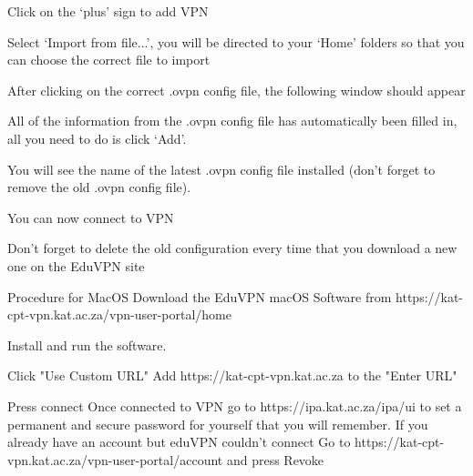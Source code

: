 Click on the ‘plus’ sign to add VPN

Select ‘Import from file...’, you will be directed to your ‘Home’ folders so that you can choose the correct file to import


After clicking on the correct .ovpn config file, the following window should appear


All of the information from the .ovpn config file has  automatically been filled in, all you need to do is click ‘Add’.

You will see the name of the latest .ovpn config file installed (don't forget to remove the old .ovpn config file).


You can now connect to VPN 


Don’t forget to delete the old configuration every time that you download a new one on the EduVPN site




Procedure for MacOS
Download the EduVPN macOS Software from https://kat-cpt-vpn.kat.ac.za/vpn-user-portal/home

















Install and run the software.


Click "Use Custom URL"
Add  https://kat-cpt-vpn.kat.ac.za to the "Enter URL"
































Press connect
Once connected to VPN go to https://ipa.kat.ac.za/ipa/ui to set a permanent and secure password for yourself that you will remember.
If you already have an account but eduVPN couldn't connect
Go to https://kat-cpt-vpn.kat.ac.za/vpn-user-portal/account and press Revoke









